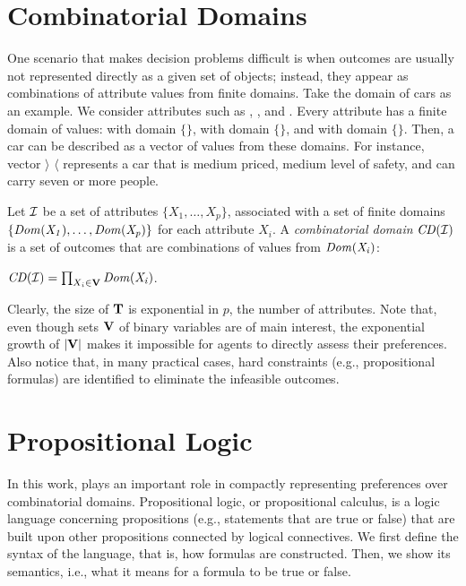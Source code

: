 \section{Combinatorial Domains \label{sec:comb_domains}}
One scenario that makes decision problems difficult is when outcomes
are usually not represented directly as a given set of objects; instead,
they appear as combinations of attribute values from finite domains.
Take the domain of cars as an example.
We consider attributes such as , , and .
Every attribute has a finite domain of values:
 with domain $\{$$\}$,
 with domain $\{$$\}$, and
 with domain $\{$$\}$.
Then, a car can be described as a vector of values from these domains.
For instance, vector $\rangle$  $\langle$ represents
a car that is medium priced, medium level of safety, and can carry seven
or more people.

\begin{definition}
	Let $\mathcal{I}$ be a set of attributes $\{X_1,\ldots,X_p\}$,
	associated with a set of finite domains $\{\it{Dom}(X_1),\ldots,\it{Dom}(X_p)\}$ for each
	attribute $X_i$.
	A \textit{combinatorial domain} $\mathit{CD}(\mathcal{I})$ is a set of outcomes 
	that are combinations of values from $\it{Dom}(X_i)$:
	\begin{center}
		$\mathit{CD}(\mathcal{I}) = \prod_{X_i \in \textbf{V}} \it{Dom}(X_i)$.
	\end{center}
\end{definition}


Clearly, the size of $\textbf{T}$ is exponential in $p$, the number of attributes.
Note that, even though sets $\textbf{V}$ of binary variables are of main interest,
the exponential growth of $|\textbf{V}|$ makes it impossible for agents
to directly assess their preferences.
Also notice that, in many practical cases, hard constraints (e.g., propositional
formulas) are identified to eliminate the infeasible outcomes.



\section{Propositional Logic}
In this work,  plays an important role in compactly representing
preferences over combinatorial domains.
Propositional logic, or propositional calculus, is a logic language concerning
propositions (e.g., statements that are true or false) that are built upon other propositions
connected by logical connectives.
We first define the syntax of the language, that is, how formulas are constructed.
Then, we show its semantics, i.e., what it means for a formula to be true or false.

